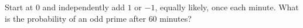 Start at $0$ and independently add $1$ or $-1$, equally likely, once each minute. What is the probability of an odd prime after $60$ minutes?
